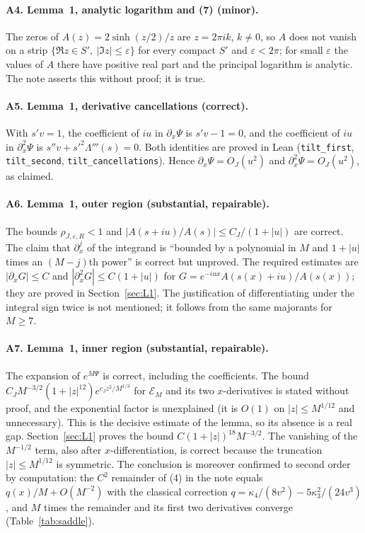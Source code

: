 \documentclass[11pt,a4paper]{article}
\theoremstyle{remark}
\numberwithin{equation}{section}
\begin{document}
\paragraph{A4. Lemma~1, analytic logarithm and (7) (minor).} The zeros of $A(z)=2\sinh(z/2)/z$
are $z=2\pi ik$, $k\ne0$, so $A$ does not vanish on a strip $\{\Re z\in S',\ |\Im z|\le
\varepsilon\}$ for every compact $S'$ and $\varepsilon<2\pi$; for small $\varepsilon$ the
values of $A$ there have positive real part and the principal logarithm is analytic. The
note asserts this without proof; it is true.

\paragraph{A5. Lemma~1, derivative cancellations (correct).} With $s'v=1$, the coefficient
of $iu$ in $\partial_x\Psi$ is $s'v-1=0$, and the coefficient of $iu$ in $\partial_x^2\Psi$
is $s''v+s'^2\Lambda'''(s)=0$. Both identities are proved in Lean
(\texttt{tilt\_first}, \texttt{tilt\_second}, \texttt{tilt\_cancellations}). Hence
$\partial_x\Psi=O_J(u^2)$ and $\partial_x^2\Psi=O_J(u^2)$, as claimed.

\paragraph{A6. Lemma~1, outer region (substantial, repairable).} The bounds
$\rho_{J,\varepsilon,R}<1$ and $|A(s+iu)/A(s)|\le C_J/(1+|u|)$ are correct. The claim that
$\partial_x^j$ of the integrand is ``bounded by a polynomial in $M$ and $1+|u|$ times an
$(M-j)$th power'' is correct but unproved. The required estimates are
$|\partial_xG|\le C$ and $|\partial_x^2G|\le C(1+|u|)$ for
$G=e^{-iux}A(s(x)+iu)/A(s(x))$; they are proved in Section~\ref{sec:L1}. The justification of
differentiating under the integral sign twice is not mentioned; it follows from the same
majorants for $M\ge7$.

\paragraph{A7. Lemma~1, inner region (substantial, repairable).} The expansion of
$e^{M\Psi}$ is correct, including the coefficients. The bound
$C_JM^{-3/2}(1+|z|^{12})e^{c_Jz^2/M^{1/3}}$ for $\mathcal E_M$ and its two $x$-derivatives
is stated without proof, and the exponential factor is unexplained (it is $O(1)$ on
$|z|\le M^{1/12}$ and unnecessary). This is the decisive estimate of the lemma, so its
absence is a real gap. Section~\ref{sec:L1} proves the bound $C(1+|z|)^{18}M^{-3/2}$.
The vanishing of the $M^{-1/2}$ term, also after $x$-differentiation, is correct because
the truncation $|z|\le M^{1/12}$ is symmetric. The conclusion is moreover confirmed to
second order by computation: the $C^2$ remainder of (4) in the note equals $q(x)/M+O(M^{-2})$ with the classical
correction $q=\kappa_4/(8v^2)-5\kappa_3^2/(24v^3)$, and $M$ times the remainder and its first
two derivatives converge (Table~\ref{tab:saddle}).
\end{document}
